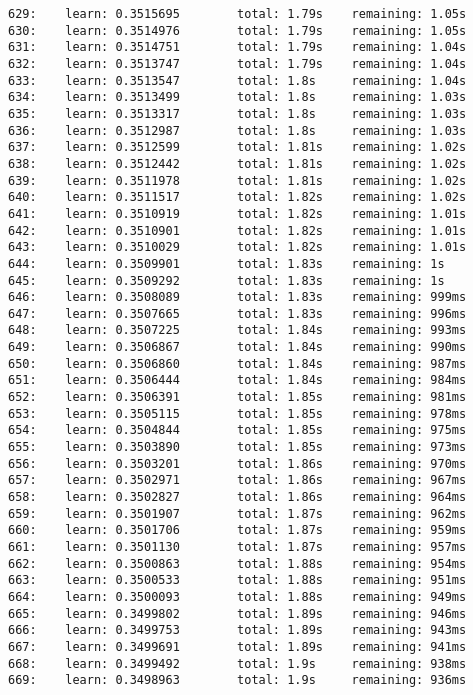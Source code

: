 \documentclass[11pt]{article}
\begin{document}
\begin{Verbatim}[commandchars=\\\{\}]
629:    learn: 0.3515695        total: 1.79s    remaining: 1.05s
630:    learn: 0.3514976        total: 1.79s    remaining: 1.05s
631:    learn: 0.3514751        total: 1.79s    remaining: 1.04s
632:    learn: 0.3513747        total: 1.79s    remaining: 1.04s
633:    learn: 0.3513547        total: 1.8s     remaining: 1.04s
634:    learn: 0.3513499        total: 1.8s     remaining: 1.03s
635:    learn: 0.3513317        total: 1.8s     remaining: 1.03s
636:    learn: 0.3512987        total: 1.8s     remaining: 1.03s
637:    learn: 0.3512599        total: 1.81s    remaining: 1.02s
638:    learn: 0.3512442        total: 1.81s    remaining: 1.02s
639:    learn: 0.3511978        total: 1.81s    remaining: 1.02s
640:    learn: 0.3511517        total: 1.82s    remaining: 1.02s
641:    learn: 0.3510919        total: 1.82s    remaining: 1.01s
642:    learn: 0.3510901        total: 1.82s    remaining: 1.01s
643:    learn: 0.3510029        total: 1.82s    remaining: 1.01s
644:    learn: 0.3509901        total: 1.83s    remaining: 1s
645:    learn: 0.3509292        total: 1.83s    remaining: 1s
646:    learn: 0.3508089        total: 1.83s    remaining: 999ms
647:    learn: 0.3507665        total: 1.83s    remaining: 996ms
648:    learn: 0.3507225        total: 1.84s    remaining: 993ms
649:    learn: 0.3506867        total: 1.84s    remaining: 990ms
650:    learn: 0.3506860        total: 1.84s    remaining: 987ms
651:    learn: 0.3506444        total: 1.84s    remaining: 984ms
652:    learn: 0.3506391        total: 1.85s    remaining: 981ms
653:    learn: 0.3505115        total: 1.85s    remaining: 978ms
654:    learn: 0.3504844        total: 1.85s    remaining: 975ms
655:    learn: 0.3503890        total: 1.85s    remaining: 973ms
656:    learn: 0.3503201        total: 1.86s    remaining: 970ms
657:    learn: 0.3502971        total: 1.86s    remaining: 967ms
658:    learn: 0.3502827        total: 1.86s    remaining: 964ms
659:    learn: 0.3501907        total: 1.87s    remaining: 962ms
660:    learn: 0.3501706        total: 1.87s    remaining: 959ms
661:    learn: 0.3501130        total: 1.87s    remaining: 957ms
662:    learn: 0.3500863        total: 1.88s    remaining: 954ms
663:    learn: 0.3500533        total: 1.88s    remaining: 951ms
664:    learn: 0.3500093        total: 1.88s    remaining: 949ms
665:    learn: 0.3499802        total: 1.89s    remaining: 946ms
666:    learn: 0.3499753        total: 1.89s    remaining: 943ms
667:    learn: 0.3499691        total: 1.89s    remaining: 941ms
668:    learn: 0.3499492        total: 1.9s     remaining: 938ms
669:    learn: 0.3498963        total: 1.9s     remaining: 936ms

\end{Verbatim}
\end{document}
